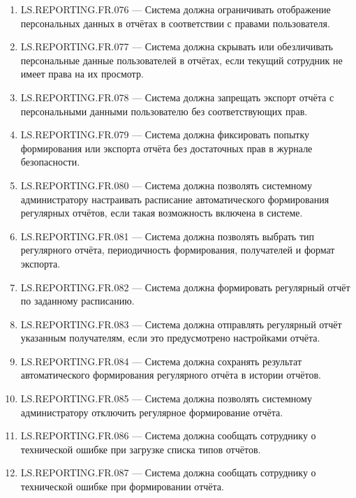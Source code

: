 \documentclass[12pt,a4paper]{article}
\begin{document}
\begin{enumerate}
		\item LS.REPORTING.FR.076 --- Система должна ограничивать отображение персональных
		данных в отчётах в соответствии с правами пользователя.
		
		\item LS.REPORTING.FR.077 --- Система должна скрывать или обезличивать персональные
		данные пользователей в отчётах, если текущий сотрудник не имеет права на их
		просмотр.
		
		\item LS.REPORTING.FR.078 --- Система должна запрещать экспорт отчёта с персональными
		данными пользователю без соответствующих прав.
		
		\item LS.REPORTING.FR.079 --- Система должна фиксировать попытку формирования
		или экспорта отчёта без достаточных прав в журнале безопасности.
		
		\item LS.REPORTING.FR.080 --- Система должна позволять системному администратору
		настраивать расписание автоматического формирования регулярных отчётов, если
		такая возможность включена в системе.
		
		\item LS.REPORTING.FR.081 --- Система должна позволять выбрать тип регулярного
		отчёта, периодичность формирования, получателей и формат экспорта.
		
		\item LS.REPORTING.FR.082 --- Система должна формировать регулярный отчёт по
		заданному расписанию.
		
		\item LS.REPORTING.FR.083 --- Система должна отправлять регулярный отчёт указанным
		получателям, если это предусмотрено настройками отчёта.
		
		\item LS.REPORTING.FR.084 --- Система должна сохранять результат автоматического
		формирования регулярного отчёта в истории отчётов.
		
		\item LS.REPORTING.FR.085 --- Система должна позволять системному администратору
		отключить регулярное формирование отчёта.
		
		\item LS.REPORTING.FR.086 --- Система должна сообщать сотруднику о технической
		ошибке при загрузке списка типов отчётов.
		
		\item LS.REPORTING.FR.087 --- Система должна сообщать сотруднику о технической
		ошибке при формировании отчёта.
		

\end{enumerate}
\end{document}
